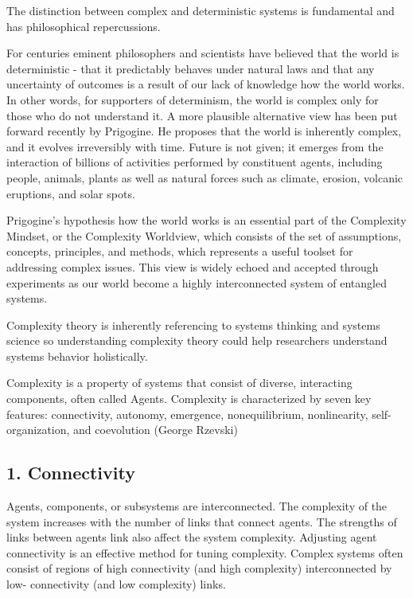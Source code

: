 \documentclass[]{article}
\begin{document}
The distinction between complex and deterministic systems is fundamental
and has philosophical repercussions.

For centuries eminent philosophers and scientists have believed that the
world is deterministic - that it predictably behaves under natural laws
and that any uncertainty of outcomes is a result of our lack of
knowledge how the world works. In other words, for supporters of
determinism, the world is complex only for those who do not understand
it. A more plausible alternative view has been put forward recently by
Prigogine. He proposes that the world is inherently complex, and it
evolves irreversibly with time. Future is not given; it emerges from the
interaction of billions of activities performed by constituent agents,
including people, animals, plants as well as natural forces such as
climate, erosion, volcanic eruptions, and solar spots.

Prigogine's hypothesis how the world works is an essential part of the
Complexity Mindset, or the Complexity Worldview, which consists of the
set of assumptions, concepts, principles, and methods, which represents
a useful toolset for addressing complex issues. This view is widely
echoed and accepted through experiments as our world become a highly
interconnected system of entangled systems.

Complexity theory is inherently referencing to systems thinking and
systems science so understanding complexity theory could help
researchers understand systems behavior holistically.

Complexity is a property of systems that consist of diverse, interacting
components, often called Agents. Complexity is characterized by seven
key features: connectivity, autonomy, emergence, nonequilibrium,
nonlinearity, self-organization, and coevolution (George Rzevski)

\subsection{1. Connectivity}\label{connectivity}

Agents, components, or subsystems are interconnected. The complexity of
the system increases with the number of links that connect agents. The
strengths of links between agents link also affect the system
complexity. Adjusting agent connectivity is an effective method for
tuning complexity. Complex systems often consist of regions of high
connectivity (and high complexity) interconnected by low- connectivity
(and low complexity) links.
\end{document}
